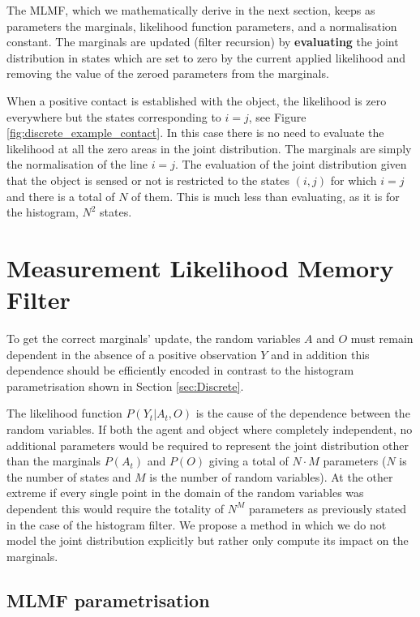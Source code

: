 The MLMF, which we mathematically derive in the next section, keeps as parameters the marginals, likelihood function parameters, and a normalisation 
constant. The marginals are updated (filter recursion) by \textbf{evaluating} the joint distribution in states which are set to zero by the current 
applied likelihood and removing the value of the zeroed parameters from the marginals. 

When a positive contact is established with the object, the likelihood is zero everywhere but the states corresponding to  $i=j$, 
see Figure \ref{fig:discrete_example_contact}. In this case there is no need to evaluate the likelihood at all the zero areas 
in the joint distribution. The marginals are simply the normalisation of the line $i=j$. The evaluation of the joint distribution 
given that the object is sensed or not is restricted to the states $(i,j)$ for which $i=j$ and there is a total of $N$ of them. 
This is much less than evaluating, as it is for the histogram, $N^2$ states.


\FloatBarrier
\section{Measurement Likelihood Memory Filter}\label{ch5:MLMF}

To get the correct marginals' update, the random variables $A$ and $O$ must remain 
dependent in the absence of a positive observation $Y$ and in addition this dependence should be efficiently encoded in contrast to the
histogram parametrisation shown in Section \ref{sec:Discrete}. 

The likelihood function $P(Y_t|A_t,O)$ is the cause of the dependence between the random variables. If both the agent and object 
where completely independent, no additional parameters would be required to represent the joint distribution other than the marginals 
$P(A_t)$ and $P(O)$ giving a total of $N \cdot M$ parameters ($N$ is the number of states and $M$ is the number of random variables). 
At the other extreme if every single point in the domain of the random variables was dependent this would require the totality 
of $N^M$ parameters as previously stated in the case of the histogram filter. We propose a method in which we do not model the joint
distribution explicitly but rather only compute its impact on the marginals. 

\subsection{MLMF parametrisation}

